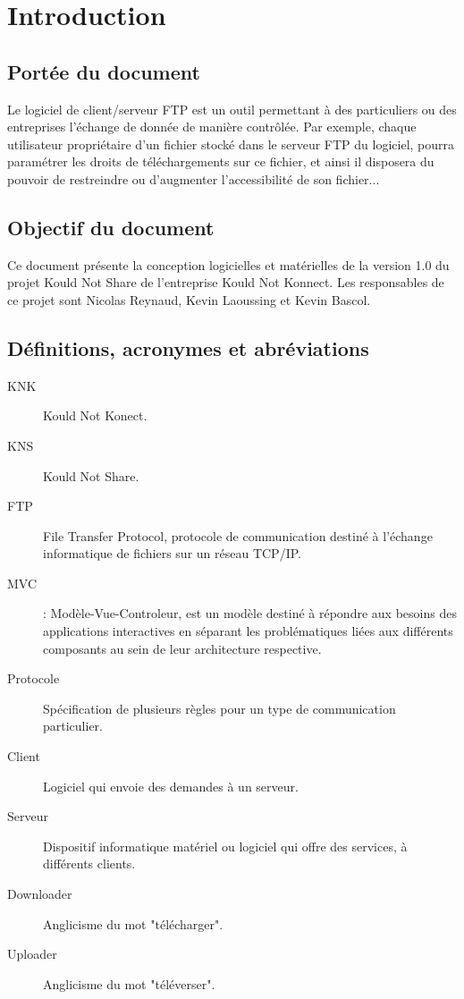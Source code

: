 \documentclass[10pt,a4paper]{report}
\begin{document}

\section{Introduction}


\subsection{Portée du document}
Le logiciel de client/serveur FTP est un outil permettant à des particuliers ou des entreprises l'échange de donnée de manière contrôlée. Par exemple, chaque utilisateur propriétaire d'un fichier stocké dans le serveur FTP du logiciel, pourra paramétrer les droits de téléchargements sur ce fichier, et ainsi il disposera du pouvoir de restreindre ou d'augmenter l'accessibilité de son fichier...

\subsection{Objectif du document}
\begin{flushleft}
Ce document présente la conception logicielles et matérielles de la version 1.0 du projet Kould Not Share de l'entreprise Kould Not Konnect. Les responsables de ce projet sont Nicolas Reynaud, Kevin Laoussing et Kevin Bascol.
\end{flushleft}

\subsection{Définitions, acronymes et abréviations}
\begin{description}
\item[KNK] Kould Not Konect.
\item[KNS] Kould Not Share.
\item[FTP] File Transfer Protocol, protocole de communication destiné à l'échange informatique de fichiers sur un réseau TCP/IP.
\item [MVC] : Modèle-Vue-Controleur, est un modèle destiné à répondre aux besoins des applications interactives en séparant les problématiques liées aux différents composants au sein de leur architecture respective.
\item[Protocole] Spécification de plusieurs règles pour un type de communication particulier.
\item[Client] Logiciel qui envoie des demandes à un serveur.
\item[Serveur] Dispositif informatique matériel ou logiciel qui offre des services, à différents clients.
\item[Downloader] Anglicisme du mot "télécharger".
\item[Uploader] Anglicisme du mot "téléverser".
\end{description}
\end{document}
